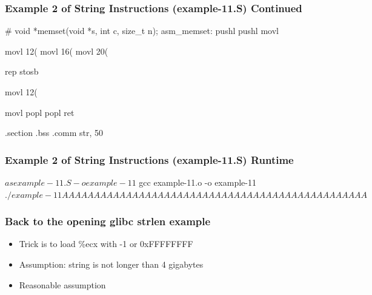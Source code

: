 \documentclass[11pt,xcolor=dvipsnames]{beamer}
\newcommand{\mvs}{\vspace{-0.95em}}
\begin{document}
\begin{frame}[fragile,t]
\mvs
\frametitle{Example 2 of String Instructions (example-11.S) Continued}
\begin{gascode}
# void *memset(void *s, int c, size_t n);
asm_memset:
  pushl %
  pushl %
  movl %

  movl 12(%
  movl 16(%
  movl 20(%

  rep stosb

  movl 12(%

  movl %
  popl %
  popl %
  ret

.section .bss
  .comm str, 50
\end{gascode}
\end{frame}

\begin{frame}[fragile,t]
\mvs
\frametitle{Example 2 of String Instructions (example-11.S) Runtime}
\begin{textcode}
$ as example-11.S -o example-11
$ gcc example-11.o -o example-11
$ ./example-11
AAAAAAAAAAAAAAAAAAAAAAAAAAAAAAAAAAAAAAAAAAAAAAAA
$
\end{textcode}
\end{frame}

\begin{frame}[fragile,t]
\mvs
\frametitle{Back to the opening glibc strlen example}
\begin{itemize}
  \item Trick is to load {\ttfamily \%ecx} with -1 or {\ttfamily 0xFFFFFFFF}
  \item Assumption: string is not longer than 4 gigabytes
  \item Reasonable assumption
\end{itemize}
\end{frame}
\end{document}
